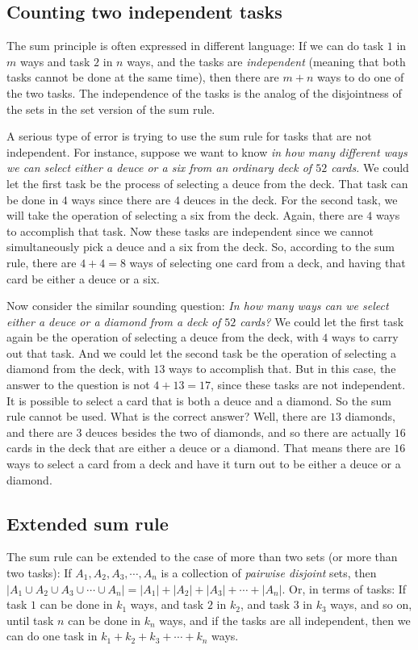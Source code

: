 \subsection{Counting two independent tasks}
The sum principle is often expressed in different language: If we can do task $1$ in $m$ ways
and task $2$ in $n$ ways, and the tasks are {\itshape independent} (meaning that both
tasks cannot be done at the same time), then there are $m+n$ ways to do one of the two tasks.
The independence of the tasks is the analog of the disjointness of the sets in the set version
of the sum rule.

A serious type of error\marginnote{\dbend}
 is trying to use the sum rule for tasks that are
not independent. For instance, suppose we want to know \emph{in how many different ways
we can select  either a deuce or a six from an ordinary deck of $52$ cards.} We
could let the first task be the process of selecting a deuce from the deck. That
task can be done in $4$ ways since there are $4$ deuces in the deck. For the
second task, we will take the operation of selecting a six from the deck. Again,
there are $4$ ways to accomplish that task. Now these tasks are independent since
we cannot simultaneously pick a deuce and a six from the deck. So, according to
the sum rule, there are $4+4=8$ ways of selecting one card from a deck, and having
that card be either a deuce or a six.\

Now consider the similar sounding question: \emph{In how many ways can we select
either a deuce or a diamond from a deck of $52$ cards?} We could let the first task
again be the operation of selecting a deuce from the deck, with $4$ ways to carry
out that task. And we could let the second task be the operation of selecting a
diamond from the deck, with $13$ ways to accomplish that. But in this case, the
answer to the question is not $4+13 = 17$, since these tasks are not
independent. It is possible to select a card that is both a deuce and a
diamond. So the sum rule cannot be used. What is the correct answer? Well, there
are $13$ diamonds, and there are $3$ deuces besides the two of diamonds, and so
there are actually $16$ cards in the deck that are either a deuce or a diamond. That
means there are $16$ ways to select a card from a deck and have it turn out to be
either a deuce or a diamond.

\subsection{Extended sum rule}
The sum rule can be extended to the case of more than two sets (or more than two tasks):
If $A_1, A_2, A_3, \cdots,A_n$ is a collection of {\itshape pairwise disjoint} sets,
then $|A_1\cup A_2\cup A_3\cup\cdots\cup A_n| = |A_1|+|A_2|+|A_3|+\cdots+|A_n|$.
Or, in terms of tasks: If task $1$ can be done in $k_1$ ways, and task $2$ in $k_2$,
and task $3$ in $k_3$ ways, and so on, until task $n$ can be done in $k_n$ ways,
and if the tasks are all independent, 
then we can do one task in $k_1+k_2+k_3+\cdots + k_n$
ways. 

